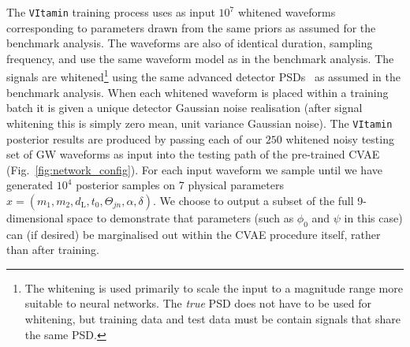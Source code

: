 \documentclass[%
showpacs,
nofootinbib,
 amsmath,amssymb,
 aps,
 twocolumn,
 prl,
 reprint,
floatfix,
]{revtex4-1}
\begin{document}
%
%
The \texttt{VItamin} training process uses as input $10^{7}$ whitened
waveforms corresponding to parameters drawn from the same priors as assumed for
the benchmark analysis. The waveforms are also of identical duration, sampling
frequency, and use the same waveform model as in the benchmark analysis.
The signals are whitened\footnote{The whitening is used primarily to
scale the input to a magnitude range more suitable to neural networks. The
\emph{true} \ac{PSD} does not have to be used for whitening, but training data
and test data must be contain signals that share the same \ac{PSD}.}
using the same advanced detector \acp{PSD}~\cite{aligo_noisecurves} as
assumed in the benchmark analysis. When each whitened waveform is placed
within a training batch it is given a unique detector Gaussian noise
realisation (after signal whitening this is simply zero mean, unit
variance Gaussian noise). The \texttt{VItamin} posterior results are produced by
passing each of our $250$ whitened noisy testing set of \ac{GW} waveforms
as input into the testing path of the pre-trained
\ac{CVAE} (Fig.~\ref{fig:network_config}). For each input waveform we sample until we
have generated $10^4$ posterior samples on 7 physical parameters
$x=(m_1,m_2,d_{\text{L}},t_{0},\Theta_{jn},\alpha,\delta)$. We choose to
output a subset of the full 9-dimensional space to demonstrate that parameters
(such as $\phi_0$ and $\psi$ in this case) can (if desired) be
marginalised out within the \ac{CVAE} procedure itself, rather than after
training. 
\end{document}
